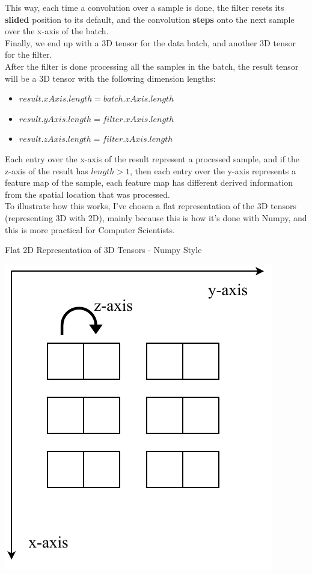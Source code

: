 \documentclass[a4paper, 12pt]{report}
\begin{document}
This way, each time a convolution over a sample is done, the filter resets its \textbf{slided} position to its default, and the convolution \textbf{steps} onto the next sample over the x-axis of the batch.\\
Finally, we end up with a 3D tensor for the data batch, and another 3D tensor for the filter.\\
After the filter is done processing all the samples in the batch, the result tensor will be a 3D tensor with the following dimension lengths:
\begin{itemize}[nosep]
	\item $ result.xAxis.length = batch.xAxis.length $
	\item $ result.yAxis.length = filter.xAxis.length $
	\item $ result.zAxis.length = filter.zAxis.length $
\end{itemize}
Each entry over the x-axis of the result represent a processed sample, and if the z-axis of the result has $ length > 1 $, then each entry over the y-axis represents a feature map of the sample, each feature map has different derived information from the spatial location that was processed.\\
To illustrate how this works, I've chosen a flat representation of the 3D tensors (representing 3D with 2D), mainly because this is how it's done with Numpy, and this is more practical for Computer Scientists.
\begin{blockfigure}{Flat 2D Representation of 3D Tensors - Numpy Style}
		\begin{center}
			\includegraphics[height=0.21\textheight]{numpy-3Dtensor-axis}
		\end{center}
\end{blockfigure}
\newpage
\end{document}
